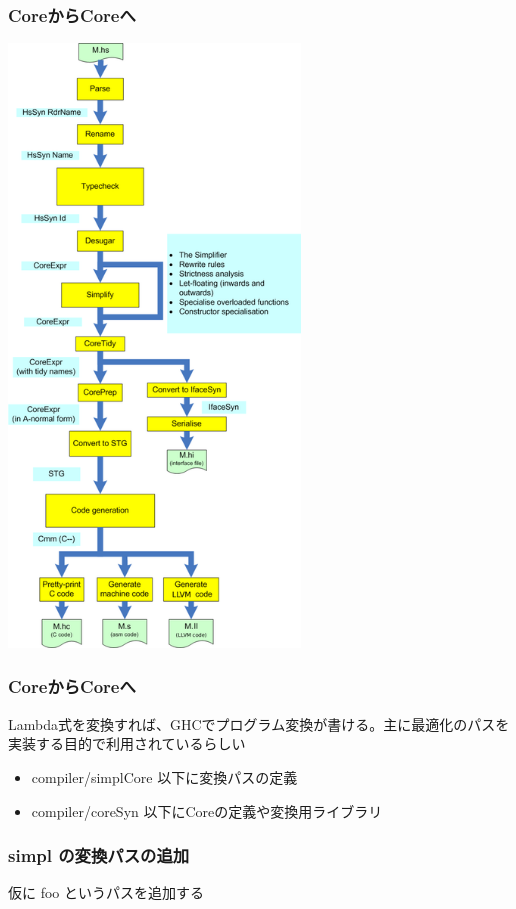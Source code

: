 \documentclass[cjk,dvipdfm,14pt]{beamer}
\begin{document}
\begin{frame}[fragile]
\frametitle{CoreからCoreへ}

\includegraphics[height=16cm]{./hscpipe2.png}

\end{frame}





\begin{frame}[fragile]
\frametitle{CoreからCoreへ}

Lambda式を変換すれば、GHCでプログラム変換が書ける。主に最適化のパスを実装する目的で利用されているらしい
\begin{itemize}
\item compiler/simplCore 以下に変換パスの定義
\item compiler/coreSyn 以下にCoreの定義や変換用ライブラリ
\end{itemize}

\end{frame}

\begin{frame}[fragile]
\frametitle{simpl の変換パスの追加}

仮に foo というパスを追加する

\hrulefill

\end{frame}
\end{document}
